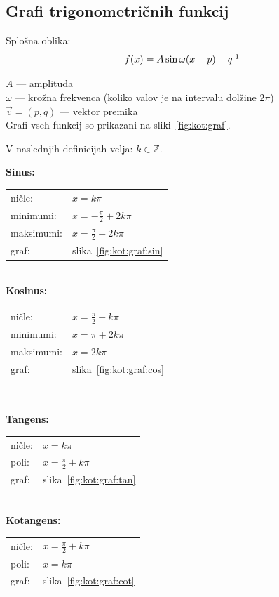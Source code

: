 \documentclass[a4paper,oneside,12pt,fleqn]{article}
\def\Z{\ensuremath{\mathbb Z}}
\numberwithin{equation}{section}
\begin{document}
\subsection{Grafi trigonometričnih funkcij}
\label{sec:kot:graf}
Splošna oblika:
\[ f(x) = A\sin\omega(x-p)+q \; \footnotemark \]

$A$ --- amplituda \\
$\omega$ --- krožna frekvenca (koliko valov je na intervalu dolžine $2\pi$) \\
$\vec{v} = (p,q)$ --- vektor premika \\
Grafi vseh funkcij so prikazani na sliki~\ref{fig:kot:graf}.

V naslednjih definicijah velja: $k \in \Z$.

\parbox[t]{0.5\textwidth}{
\textbf{Sinus:} \\[6pt]
\begin{tabular}[h!]{ll}
  ničle:    & $x = k\pi$ \\
  minimumi: & $x = -\frac{\pi}{2} + 2k\pi$ \\
  maksimumi:& $x = \frac{\pi}{2} + 2k\pi$ \\  
  graf:     & slika~\ref{fig:kot:graf:sin}
\end{tabular} \\[12pt]
\textbf{Kosinus:}\\[6pt]
\begin{tabular}[h!]{ll}
  ničle:    & $x = \frac{\pi}{2} + k\pi$ \\
  minimumi: & $x = \pi + 2k\pi$ \\
  maksimumi:& $x = 2k\pi$ \\ 
  graf:     & slika~\ref{fig:kot:graf:cos}
\end{tabular} \\[12pt]
}
\parbox[t]{0.5\textwidth}{
\textbf{Tangens:} \\[6pt]
\begin{tabular}[h!]{ll}
  ničle: & $x = k\pi$ \\
  poli:  & $x = \frac{\pi}{2} + k\pi$ \\
  graf:     & slika~\ref{fig:kot:graf:tan}
\end{tabular} \\[24pt]
\textbf{Kotangens:} \\[6pt]
\begin{tabular}[h!]{ll}
  ničle:  & $x = \frac{\pi}{2} + k\pi$ \\
  poli: & $x = k\pi$ \\
  graf:     & slika~\ref{fig:kot:graf:cot}
\end{tabular} \\[12pt]
}
\end{document}
